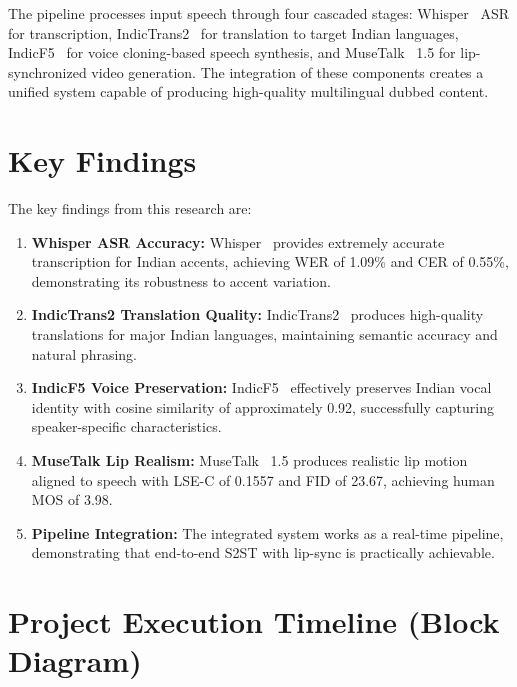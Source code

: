 \documentclass[12pt,oneside]{report}
\begin{document}
The pipeline processes input speech through four cascaded stages: Whisper~\cite{radford2023whisper} ASR for transcription, IndicTrans2~\cite{gala2023indictrans2} for translation to target Indian languages, IndicF5~\cite{indicf5_2025} for voice cloning-based speech synthesis, and MuseTalk~\cite{zhang2023musetalk} 1.5 for lip-synchronized video generation. The integration of these components creates a unified system capable of producing high-quality multilingual dubbed content.


\section{Key Findings}

The key findings from this research are:

\begin{enumerate}
    \item \textbf{Whisper ASR Accuracy:} Whisper~\cite{radford2023whisper} provides extremely accurate transcription for Indian accents, achieving WER of 1.09\% and CER of 0.55\%, demonstrating its robustness to accent variation.
    
    \item \textbf{IndicTrans2 Translation Quality:} IndicTrans2~\cite{gala2023indictrans2} produces high-quality translations for major Indian languages, maintaining semantic accuracy and natural phrasing.
    
    \item \textbf{IndicF5 Voice Preservation:} IndicF5~\cite{indicf5_2025} effectively preserves Indian vocal identity with cosine similarity of approximately 0.92, successfully capturing speaker-specific characteristics.
    
    \item \textbf{MuseTalk Lip Realism:} MuseTalk~\cite{zhang2023musetalk} 1.5 produces realistic lip motion aligned to speech with LSE-C of 0.1557 and FID of 23.67, achieving human MOS of 3.98.
    
    \item \textbf{Pipeline Integration:} The integrated system works as a real-time pipeline, demonstrating that end-to-end S2ST with lip-sync is practically achievable.
\end{enumerate}


\section{Project Execution Timeline (Block Diagram)}
\end{document}
